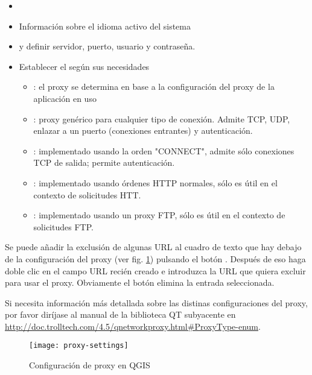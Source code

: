 
\begin{itemize}
\item {}
\item Información sobre el idioma activo del sistema
\end{itemize}


\begin{itemize}
\item {} y definir servidor, puerto, usuario y
contraseña.
\item Establecer el  según sus necesidades
 \begin{itemize}
  \item {}: el proxy se determina en base a la configuración del proxy de la aplicación en uso
  \item {}: proxy genérico para cualquier tipo de conexión. Admite TCP, UDP, enlazar a un puerto (conexiones entrantes) y autenticación.
  \item {}: implementado usando la orden "CONNECT", admite sólo conexiones TCP de salida; permite autenticación.
  \item {}: implementado usando órdenes HTTP normales, sólo es útil en el contexto de solicitudes HTT.
  \item {}: implementado usando un proxy FTP, sólo es útil en el contexto de solicitudes FTP.
 \end{itemize}
\end{itemize}

Se puede añadir la exclusión de algunas URL al cuadro de texto que hay debajo de la configuración del proxy (ver
fig. \ref{fig:proxy-settings}) pulsando el botón . Después de eso
haga doble clic en el campo 
URL recién creado e introduzca la URL que quiera excluir para usar el proxy. Obviamente el botón  
elimina la entrada seleccionada.

Si necesita información más detallada sobre las distinas configuraciones del proxy,
por favor diríjase al manual de la biblioteca QT subyacente en
\url{http://doc.trolltech.com/4.5/qnetworkproxy.html#ProxyType-enum}.

\begin{figure}[ht]
   \begin{center}
   \caption{Configuración de proxy en QGIS \nixcaption}
   \texttt{[image: proxy-settings]}
   \label{fig:proxy-settings}
\end{center} 
\end{figure}


